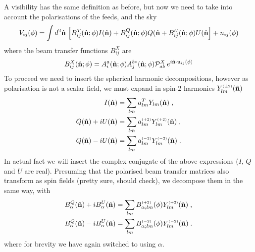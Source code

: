 \documentclass{revtex4}
\begin{document}
A visibility has the same definition as before, but now we need to
take into account the polarisations of the feeds, and the sky
\begin{equation}
\label{eq:vispol}
V_{ij}(\phi) = \int d^2\hat{\mathbf{n}} \, \left[ B^T_{ij}(\hat{\mathbf{n}}; \phi) I(\hat{\mathbf{n}}) +
  B^Q_{ij}(\hat{\mathbf{n}}; \phi) Q(\hat{\mathbf{n}} + B^U_{ij}(\hat{\mathbf{n}}; \phi) U(\hat{\mathbf{n}} \right]+ n_{ij}(\phi)
\end{equation}
where the beam transfer functions $B^X_{ij}$ are
\begin{equation}
B^X_{ij}(\hat{\mathbf{n}}; \phi) = A_i^a(\hat{\mathbf{n}}; \phi) A_j^{b *}(\hat{\mathbf{n}}; \phi)
\mathcal{P}^X_{ab} \:e^{i \hat{\mathbf{n}} \cdot
  \mathbf{u}_{ij}(\phi)} 
\end{equation}
To proceed we need to insert the spherical harmonic decompositions,
however as polarisation is not a scalar field, we must expand in
spin-2 harmonics $Y_{lm}^{\scriptscriptstyle \left(\pm 2\right)}(\hat{\mathbf{n}})$
\begin{align}
I(\hat{\mathbf{n}}) & = \sum_{lm} a^T_{lm} Y_{lm}(\hat{\mathbf{n}}) \; ,\\
Q(\hat{\mathbf{n}}) + i U(\hat{\mathbf{n}}) & = \sum_{lm} a^{\scriptscriptstyle \left(+2\right)}_{lm}
Y^{\scriptscriptstyle \left(+2\right)}_{lm}(\hat{\mathbf{n}}) \; ,\\
Q(\hat{\mathbf{n}}) - i U(\hat{\mathbf{n}}) & = \sum_{lm} a^{\scriptscriptstyle \left(-2\right)}_{lm}
Y^{\scriptscriptstyle \left(-2\right)}_{lm}(\hat{\mathbf{n}}) \; .
\end{align}
In actual fact we will insert the complex conjugate of the above
expressions ($I$, $Q$ and $U$ are real). Presuming that the polarised beam
transfer matrices also transform as spin fields (pretty sure, should
check), we decompose them in the same way, with 
\begin{align}
B^Q_{\alpha}(\hat{\mathbf{n}}) + i B^U_{\alpha}(\hat{\mathbf{n}}) & = \sum_{lm}
B^{\scriptscriptstyle \left(+2\right)}_{\alpha;lm} (\phi)
Y^{\scriptscriptstyle \left(+2\right)}_{lm}(\hat{\mathbf{n}}) \; ,\\
B^Q_{\alpha}(\hat{\mathbf{n}}) - i B^U_{\alpha}(\hat{\mathbf{n}}) & = \sum_{lm}
B^{\scriptscriptstyle \left(-2\right)}_{\alpha;lm} (\phi)
Y^{\scriptscriptstyle \left(-2\right)}_{lm}(\hat{\mathbf{n}}) \; .
\end{align}
where for brevity we have again switched to using $\alpha$.
\end{document}
